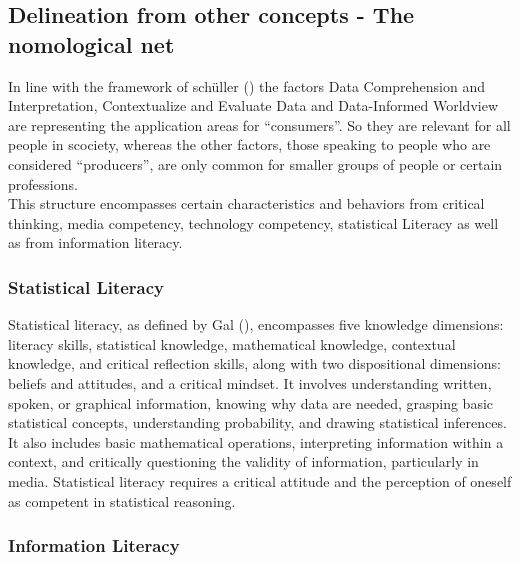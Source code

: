 \documentclass[
  12pt,
  a4paper,
  twoside]{article}
\begin{document}
\subsection{Delineation from other concepts - The nomological net}\label{delineation-from-other-concepts---the-nomological-net}

In line with the framework of schüller () the factors Data Comprehension and Interpretation, Contextualize and Evaluate Data and Data-Informed Worldview are representing the application areas for ``consumers''. So they are relevant for all people in scociety, whereas the other factors, those speaking to people who are considered ``producers'', are only common for smaller groups of people or certain professions.\\
This structure encompasses certain characteristics and behaviors from critical thinking, media competency, technology competency, statistical Literacy as well as from information literacy.

\subsubsection{Statistical Literacy}\label{statistical-literacy}

Statistical literacy, as defined by Gal (), encompasses five knowledge dimensions: literacy skills, statistical knowledge, mathematical knowledge, contextual knowledge, and critical reflection skills, along with two dispositional dimensions: beliefs and attitudes, and a critical mindset. It involves understanding written, spoken, or graphical information, knowing why data are needed, grasping basic statistical concepts, understanding probability, and drawing statistical inferences. It also includes basic mathematical operations, interpreting information within a context, and critically questioning the validity of information, particularly in media. Statistical literacy requires a critical attitude and the perception of oneself as competent in statistical reasoning.

\subsubsection{Information Literacy}\label{information-literacy}
\end{document}
